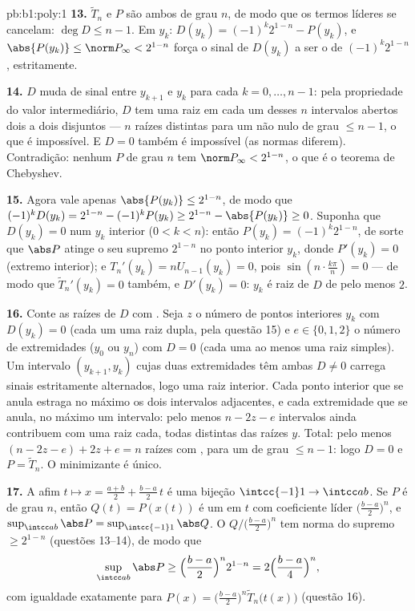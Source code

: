 \begin{solution}{pb:b1:poly:1}
\textbf{13.} $\widetilde T_n$ e $P$ são ambos  de grau
$n$, de modo que os termos líderes se cancelam: $\deg D \leq n - 1$. Em $y_k$:
$D(y_k) = (-1)^k2^{1-n} - P(y_k)$, e $\abs{P(y_k)} \leq \norm
P_\infty < 2^{1-n}$ força o sinal de $D(y_k)$ a ser o de
$(-1)^k2^{1-n}$, estritamente.

\textbf{14.} $D$ muda de sinal entre $y_{k+1}$ e $y_k$ para cada
$k = 0, \dots, n-1$: pela propriedade do valor intermediário, $D$ tem uma
raiz em cada um desses $n$ intervalos abertos dois a dois disjuntos ---
$n$ raízes distintas para um  não nulo de grau $\leq n - 1$,
o que é impossível. E $D = 0$ também é impossível (as normas diferem).
Contradição: nenhum $P$  de grau $n$ tem $\norm P_\infty <
2^{1-n}$, o que é o teorema de Chebyshev.

\textbf{15.} Agora vale apenas $\abs{P(y_k)} \leq 2^{1-n}$, de modo que $(-1)^k
D(y_k) = 2^{1-n} - (-1)^kP(y_k) \geq 2^{1-n} - \abs{P(y_k)} \geq
0$. Suponha que $D(y_k) = 0$ num $y_k$ interior ($0 < k < n$): então
$P(y_k) = (-1)^k2^{1-n}$, de sorte que $\abs P$ atinge o seu supremo
$2^{1-n}$ no ponto interior $y_k$, donde $P'(y_k) = 0$
(extremo interior); e $T_n'(y_k) = nU_{n-1}(y_k) = 0$, pois
$\sin(n\cdot\frac{k\pi}n) = 0$ --- de modo que $\widetilde T_n'(y_k) = 0$
também, e $D'(y_k) = 0$: $y_k$ é raiz de $D$ de  pelo
menos $2$.

\textbf{16.} Conte as raízes de $D$ com . Seja $z$ o
número de pontos interiores $y_k$ com $D(y_k) = 0$ (cada um uma raiz
dupla, pela questão 15) e $e \in \{0, 1, 2\}$ o número de
extremidades ($y_0$ ou $y_n$) com $D = 0$ (cada uma ao menos uma raiz
simples). Um intervalo $(y_{k+1}, y_k)$ cujas duas extremidades têm ambas $D
\neq 0$ carrega sinais estritamente alternados, logo uma
raiz interior. Cada ponto interior que se anula estraga no máximo os dois
intervalos adjacentes, e cada extremidade que se anula, no máximo um
intervalo: pelo menos $n - 2z - e$ intervalos ainda contribuem com uma
raiz cada, todas distintas das raízes $y$. Total: pelo menos $(n - 2z - e) + 2z + e = n$
raízes com , para um  de grau $\leq n - 1$:
logo $D = 0$ e $P = \widetilde T_n$. O minimizante é único.

\textbf{17.} A  afim $t \mapsto x = \frac{a+b}2 +
\frac{b-a}2\,t$ é uma bijeção $\intcc{-1}1 \to \intcc ab$. Se $P$
é  de grau $n$, então $Q(t) = P(x(t))$ é um  em
$t$ com coeficiente líder $\bigl(\frac{b-a}2\bigr)^n$, e
$\sup_{\intcc ab}\abs P = \sup_{\intcc{-1}1}\abs Q$. O  $Q/\bigl(\frac{b-a}2\bigr)^n$ tem norma do supremo $\geq
2^{1-n}$ (questões 13--14), de modo que
\[
\sup_{\intcc ab}\abs P \geq \Bigl(\frac{b-a}2\Bigr)^n 2^{1-n}
= 2\Bigl(\frac{b-a}4\Bigr)^n ,
\]
com igualdade exatamente para $P(x) = \bigl(\frac{b-a}2\bigr)^n
\widetilde T_n\bigl(t(x)\bigr)$ (questão 16).


\end{solution}
